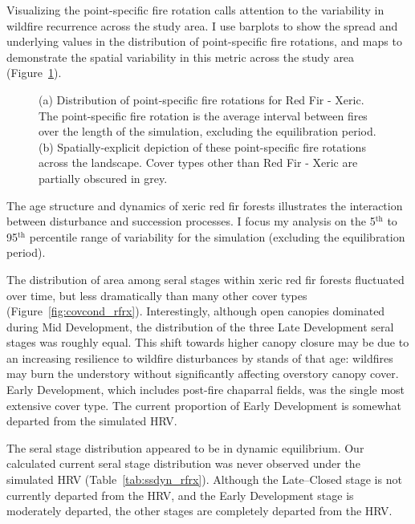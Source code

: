 Visualizing the point-specific fire rotation calls attention to the variability in wildfire recurrence across the study area. I use barplots to show the spread and underlying values in the distribution of point-specific fire rotations, and maps to demonstrate the spatial variability in this metric across the study area (Figure~\ref{fig:preturn_rfrx}).

\begin{figure}[!htbp]
  \centering
  \caption{(a) Distribution of point-specific fire rotations for Red Fir - Xeric. The point-specific fire rotation is the average interval between fires over the length of the simulation, excluding the equilibration period. (b) Spatially-explicit depiction of these point-specific fire rotations across the landscape. Cover types other than Red Fir - Xeric are partially obscured in grey.}
\label{fig:preturn_rfrx}
\end{figure}

The age structure and dynamics of xeric red fir forests illustrates the interaction between disturbance and succession processes. I focus my analysis on the 5$^{\text{th}}$ to 95$^{\text{th}}$ percentile range of variability for the simulation (excluding the equilibration period). %

The distribution of area among seral stages within xeric red fir forests fluctuated over time, but less dramatically than many other cover types (Figure~\ref{fig:covcond_rfrx}). Interestingly, although open canopies dominated during Mid Development, the distribution of the three Late Development seral stages was roughly equal. This shift towards higher canopy closure may be due to an increasing resilience to wildfire disturbances by stands of that age: wildfires may burn the understory without significantly affecting overstory canopy cover. Early Development, which includes post-fire chaparral fields, was the single most extensive cover type. The current proportion of Early Development is somewhat departed from the simulated HRV. %

The seral stage distribution appeared to be in dynamic equilibrium. Our calculated current seral stage distribution was never observed under the simulated HRV (Table~\ref{tab:ssdyn_rfrx}). Although the Late--Closed stage is not currently departed from the HRV, and the Early Development stage is moderately departed, the other stages are completely departed from the HRV.

